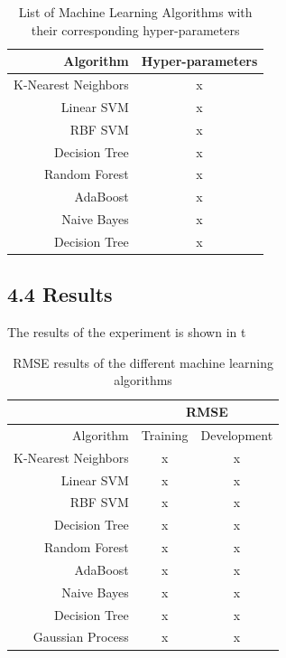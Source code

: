 \documentclass{article}
\begin{document}
 \begin{table}
  \begin{center}
   \begin{tabular}{ | r | c |}
    \hline
     Algorithm & Hyper-parameters \\ \hline\hline
    K-Nearest Neighbors        & x \\ \hline
    Linear SVM                 & x \\ \hline
    RBF SVM                    & x \\ \hline
    Decision Tree              & x \\ \hline
    Random Forest              & x \\ \hline
    AdaBoost                   & x \\ \hline
    Naive Bayes                & x \\ \hline
    Decision Tree              & x \\ \hline
   \end{tabular}
  \end{center}
  \caption{List of Machine Learning Algorithms with their corresponding hyper-parameters}
  \label{list_mls}
 \end{table}
 \subsection{4.4 Results}
 The results of the experiment is shown in t
 
 \begin{table}
  \begin{center}
   \begin{tabular}{ | r | c | c |}
    \hline
    & \multicolumn{2}{c|}{RMSE} \\ \hline
     Algorithm & Training & Development \\ \hline\hline
    K-Nearest Neighbors        & x & x \\ \hline
    Linear SVM                 & x & x \\ \hline
    RBF SVM                    & x & x \\ \hline
    Decision Tree              & x & x \\ \hline
    Random Forest              & x & x \\ \hline
    AdaBoost                   & x & x \\ \hline
    Naive Bayes                & x & x \\ \hline
    Decision Tree              & x & x \\ \hline
    Gaussian Process           & x & x \\ \hline
   \end{tabular}
  \end{center}
  \caption{RMSE results of the different machine learning algorithms}
  \label{rmse_results}
 \end{table}
 
\end{document}
